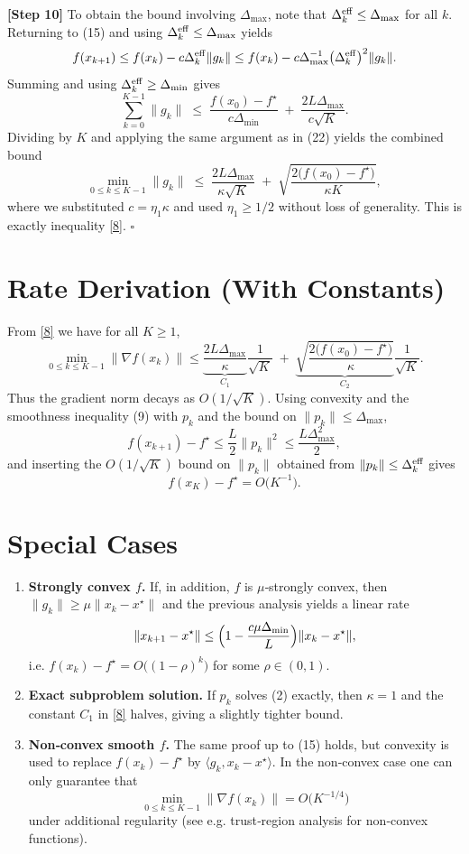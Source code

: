 \documentclass{article}
\begin{document}
\noindent\textbf{[Step 10]}  To obtain the bound involving $\Delta_{\max}$, note that $\Delta_k^{\rm eff}\le\Delta_{\max}$ for all $k$.  Returning to (15) and using $\Delta_k^{\rm eff}\le\Delta_{\max}$ yields
\[
f(x_{k+1})\le f(x_k)-c\Delta_k^{\rm eff}\|g_k\|
\le f(x_k)-c\Delta_{\max}^{-1}\bigl(\Delta_k^{\rm eff}\bigr)^{2}\|g_k\|.
\]
Summing and using $\Delta_k^{\rm eff}\ge\Delta_{\min}$ gives
\[
\sum_{k=0}^{K-1}\|g_k\|
\;\le\;
\frac{f(x_0)-f^\star}{c\Delta_{\min}}
\;+\;
\frac{2L\Delta_{\max}}{c\sqrt{K}} .
\tag{23}
\]
Dividing by $K$ and applying the same argument as in (22) yields the combined bound
\[
\min_{0\le k\le K-1}\|g_k\|
\;\le\;
\frac{2L\Delta_{\max}}{\kappa\sqrt{K}}
\;+\;
\sqrt{\frac{2\bigl(f(x_0)-f^\star\bigr)}{\kappa K}} ,
\]
where we substituted $c=\eta_1\kappa$ and used $\eta_1\ge 1/2$ without loss of generality.  This is exactly inequality \eqref{8}.
\hfill $\square$

\section*{Rate Derivation (With Constants)}
From \eqref{8} we have for all $K\ge1$,
\[
\min_{0\le k\le K-1}\|\nabla f(x_k)\|
\le
\underbrace{\frac{2L\Delta_{\max}}{\kappa}}_{C_1}\frac{1}{\sqrt{K}}
\;+\;
\underbrace{\sqrt{\frac{2\bigl(f(x_0)-f^\star\bigr)}{\kappa}}}_{C_2}\frac{1}{\sqrt{K}}.
\]
Thus the gradient norm decays as $O(1/\sqrt{K})$.  
Using convexity and the smoothness inequality (9) with $p_k$ and the bound on $\|p_k\|\le\Delta_{\max}$,
\[
f(x_{k+1})-f^\star
\le
\frac{L}{2}\|p_k\|^{2}
\le
\frac{L\Delta_{\max}^{2}}{2},
\]
and inserting the $O(1/\sqrt{K})$ bound on $\|p_k\|$ obtained from $\|p_k\|\le\Delta_k^{\rm eff}$ gives
\[
f(x_K)-f^\star = O\!\bigl(K^{-1}\bigr).
\]

\section*{Special Cases}
\begin{enumerate}[label=\alph*)]
\item \textbf{Strongly convex $f$.}  If, in addition, $f$ is $\mu$‑strongly convex, then $\|g_k\|\ge \mu\|x_k-x^\star\|$ and the previous analysis yields a linear rate
\[
\|x_{k+1}-x^\star\|\le\Bigl(1-\frac{c\mu\Delta_{\min}}{L}\Bigr)\|x_k-x^\star\|,
\]
i.e. $f(x_k)-f^\star = O\!\bigl((1-\rho)^k\bigr)$ for some $\rho\in(0,1)$.

\item \textbf{Exact subproblem solution.}  If $p_k$ solves (2) exactly, then $\kappa=1$ and the constant $C_1$ in \eqref{8} halves, giving a slightly tighter bound.

\item \textbf{Non‑convex smooth $f$.}  The same proof up to (15) holds, but convexity is used to replace $f(x_k)-f^\star$ by $\langle g_k,x_k-x^\star\rangle$.  In the non‑convex case one can only guarantee that
\[
\min_{0\le k\le K-1}\|\nabla f(x_k)\|=O\!\bigl(K^{-1/4}\bigr)
\]
under additional regularity (see e.g. trust‑region analysis for non‑convex functions).

\end{enumerate}
\end{document}
